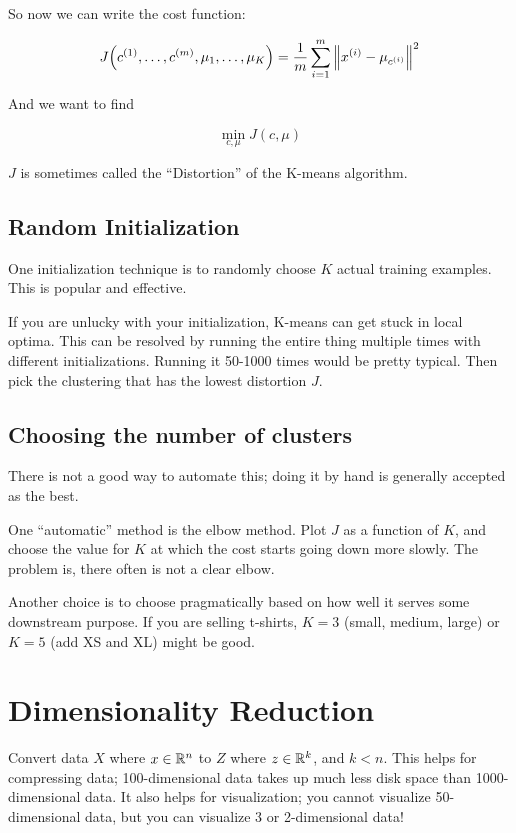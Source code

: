 So now we can write the cost function:

\[
    J\qty(c_{}^{(1)}, \dots, c_{}^{(m)}, \mu_1, \dots, \mu_K)
    = \frac{1}{m} \sum_{i=1}^m \left\lVert  x_{}^{(i)} - \mu_{c_{}^{(i)}}  \right\rVert^2
\]

And we want to find

\[ \min_{c, \mu} J(c, \mu) \]

$J$ is sometimes called the ``Distortion'' of the K-means algorithm.

\subsection{Random Initialization}

One initialization technique is to randomly choose $K$ actual training examples.
This is popular and effective.

If you are unlucky with your initialization, K-means can get stuck in local optima.
This can be resolved by running the entire thing multiple times with different initializations.
Running it 50-1000 times would be pretty typical.
Then pick the clustering that has the lowest distortion $J$.

\subsection{Choosing the number of clusters}

There is not a good way to automate this; doing it by hand is generally accepted as the best.

One ``automatic'' method is the elbow method.
Plot $J$ as a function of $K$, and choose the value for $K$ at which the cost starts going down more slowly.
The problem is, there often is not a clear elbow.

Another choice is to choose pragmatically based on how well it serves some downstream purpose.
If you are selling t-shirts, $K=3$ (small, medium, large) or $K=5$ (add XS and XL) might be good.

\section{Dimensionality Reduction}

Convert data $X$ where $x \in \mathbb{R}^n$
to $Z$ where $z \in \mathbb{R}^k$, and $k<n$.
This helps for compressing data; 100-dimensional data 
takes up much less disk space than 1000-dimensional data.
It also helps for visualization; you cannot visualize 50-dimensional data,
but you can visualize 3 or 2-dimensional data!

